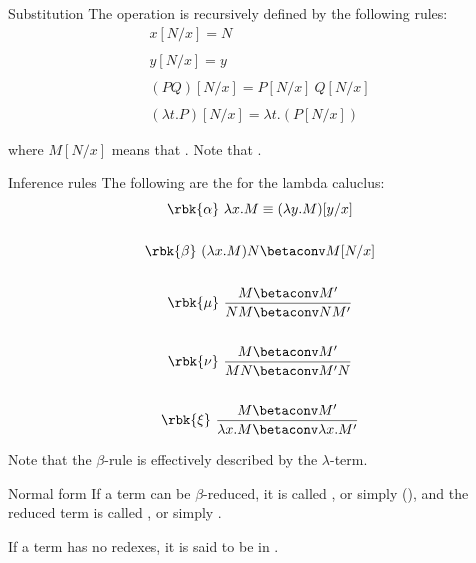 \documentclass[a4paper, 12pt]{report}
\begin{document}
    \begin{frameddefn}{Substitution}
        The  operation is recursively defined by the following rules:
        \begin{gather*}
            x[N/x] = N \\ \\
            y[N/x] = y \\ \\
            (P Q)[N/x] = P[N/x] \ Q[N/x] \\ \\
            (\lambda t.P)[N/x] = \lambda t.(P[N/x])
        \end{gather*}

        where $M[N/x]$ means that . Note that .
    \end{frameddefn}

    \begin{frameddefn}[label={inf rules}]{Inference rules}
        The following are the  for the lambda caluclus:
        \begin{gather*}
            \rbk{\alpha} \ \lambda x.M \equiv (\lambda y.M)[y/x] \\ \\
            \rbk{\beta} \ (\lambda x.M)N \betaconv M[N/x] \\ \\
            \rbk{\mu} \ \dfrac{M \betaconv M'}{NM \betaconv NM'} \\ \\
            \rbk{\nu} \ \dfrac{M \betaconv M'}{MN \betaconv M'N} \\ \\
            \rbk{\xi} \ \dfrac{M \betaconv M'}{\lambda x.M \betaconv \lambda x.M'}
        \end{gather*}

        Note that the $\beta$-rule is effectively  described by the $\lambda$-term.
    \end{frameddefn}

    \begin{frameddefn}{Normal form}
         If a term can be $\beta$-reduced, it is called , or simply  (), and the reduced term is called , or simply .

         If a term has no redexes, it is said to be in .
    \end{frameddefn}
\end{document}
